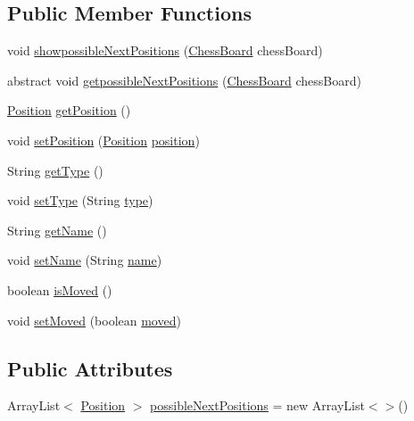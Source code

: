\subsection*{Public Member Functions}
\begin{DoxyCompactItemize}
\item 
void \hyperlink{classmodel_chess_pieces_1_1_chess_piece_a70a2f0f1a29b9545fcad604df3ad89c2}{showpossible\+Next\+Positions} (\hyperlink{classmodel_core_1_1_chess_board}{Chess\+Board} chess\+Board)
\item 
abstract void \hyperlink{classmodel_chess_pieces_1_1_chess_piece_a920de36744a00c01fde87cb4a12e4dec}{getpossible\+Next\+Positions} (\hyperlink{classmodel_core_1_1_chess_board}{Chess\+Board} chess\+Board)
\item 
\hyperlink{classmodel_core_1_1_position}{Position} \hyperlink{classmodel_chess_pieces_1_1_chess_piece_a6e88271516d06a50162a36321d10ff0e}{get\+Position} ()
\item 
void \hyperlink{classmodel_chess_pieces_1_1_chess_piece_abdd69cca4ca429e531ab58297c0036c7}{set\+Position} (\hyperlink{classmodel_core_1_1_position}{Position} \hyperlink{classmodel_chess_pieces_1_1_chess_piece_a3d4362d5b28f6edb14161196d9c6807d}{position})
\item 
String \hyperlink{classmodel_chess_pieces_1_1_chess_piece_a189d923d883085ce16d051c161c93e68}{get\+Type} ()
\item 
void \hyperlink{classmodel_chess_pieces_1_1_chess_piece_a7d2fa4377c4409371487f3e5afd5e100}{set\+Type} (String \hyperlink{classmodel_chess_pieces_1_1_chess_piece_a195487ca88c197af7c1604247be31db2}{type})
\item 
String \hyperlink{classmodel_chess_pieces_1_1_chess_piece_ac73d3ae34142cdbf7571a086ffb122c9}{get\+Name} ()
\item 
void \hyperlink{classmodel_chess_pieces_1_1_chess_piece_a86e3e4135360b5bdc7ce9f6bad817b99}{set\+Name} (String \hyperlink{classmodel_chess_pieces_1_1_chess_piece_a03d2fb76fbbff0dab72d00f2173a69ff}{name})
\item 
boolean \hyperlink{classmodel_chess_pieces_1_1_chess_piece_ad6b3bbf9101c70a29ad8087f9431b8ee}{is\+Moved} ()
\item 
void \hyperlink{classmodel_chess_pieces_1_1_chess_piece_a43b4de8cc87600ac934d85cb09c852a1}{set\+Moved} (boolean \hyperlink{classmodel_chess_pieces_1_1_chess_piece_a5bc0722badda5dc066b6a73476fc933c}{moved})
\end{DoxyCompactItemize}
\subsection*{Public Attributes}
\begin{DoxyCompactItemize}
\item 
Array\+List$<$ \hyperlink{classmodel_core_1_1_position}{Position} $>$ \hyperlink{classmodel_chess_pieces_1_1_chess_piece_aa477ac8d33b4e7c98eb6f4aec2390477}{possible\+Next\+Positions} = new Array\+List$<$$>$()
\end{DoxyCompactItemize}

